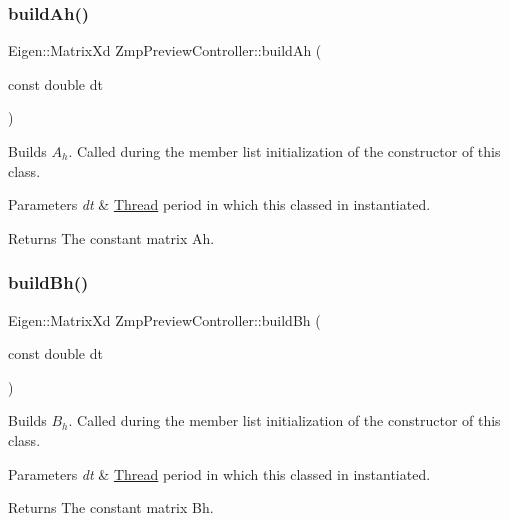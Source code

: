 \subsubsection{\texorpdfstring{build\+Ah()}{buildAh()}}
{\footnotesize\ttfamily Eigen\+::\+Matrix\+Xd Zmp\+Preview\+Controller\+::build\+Ah (\begin{DoxyParamCaption}\item[{const double}]{dt }\end{DoxyParamCaption})}

Builds $A_h$. Called during the member list initialization of the constructor of this class.


\begin{DoxyParams}{Parameters}
{\em dt} & \hyperlink{classThread}{Thread} period in which this classed in instantiated. \\
\hline
\end{DoxyParams}
\begin{DoxyReturn}{Returns}
The constant matrix Ah. 
\end{DoxyReturn}
\hypertarget{classZmpPreviewController_a0114a8bdba920b9a7fb6b35e7b90ddd1}{}\label{classZmpPreviewController_a0114a8bdba920b9a7fb6b35e7b90ddd1} 
\subsubsection{\texorpdfstring{build\+Bh()}{buildBh()}}
{\footnotesize\ttfamily Eigen\+::\+Matrix\+Xd Zmp\+Preview\+Controller\+::build\+Bh (\begin{DoxyParamCaption}\item[{const double}]{dt }\end{DoxyParamCaption})}

Builds $B_h$. Called during the member list initialization of the constructor of this class.


\begin{DoxyParams}{Parameters}
{\em dt} & \hyperlink{classThread}{Thread} period in which this classed in instantiated. \\
\hline
\end{DoxyParams}
\begin{DoxyReturn}{Returns}
The constant matrix Bh. 
\end{DoxyReturn}
\hypertarget{classZmpPreviewController_a58723464a66fc3a1122c613500bb2052}{}\label{classZmpPreviewController_a58723464a66fc3a1122c613500bb2052} 
